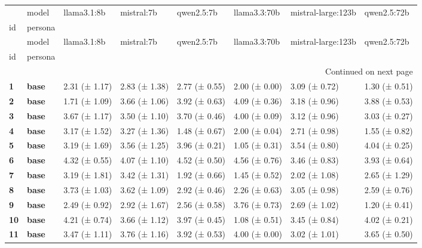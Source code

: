 \begin{longtable}{llllllll}
\toprule
 & model & llama3.1:8b & mistral:7b & qwen2.5:7b & llama3.3:70b & mistral-large:123b & qwen2.5:72b \\
id & persona &  &  &  &  &  &  \\
\midrule
\endfirsthead
\toprule
 & model & llama3.1:8b & mistral:7b & qwen2.5:7b & llama3.3:70b & mistral-large:123b & qwen2.5:72b \\
id & persona &  &  &  &  &  &  \\
\midrule
\endhead
\midrule
\multicolumn{8}{r}{Continued on next page} \\
\midrule
\endfoot
\bottomrule
\endlastfoot
\textbf{1} & \textbf{base} & 2.31 (± 1.17) & 2.83 (± 1.38) & 2.77 (± 0.55) & 2.00 (± 0.00) & 3.09 (± 0.72) & 1.30 (± 0.51) \\
\cline{1-8}
\textbf{2} & \textbf{base} & 1.71 (± 1.09) & 3.66 (± 1.06) & 3.92 (± 0.63) & 4.09 (± 0.36) & 3.18 (± 0.96) & 3.88 (± 0.53) \\
\cline{1-8}
\textbf{3} & \textbf{base} & 3.67 (± 1.17) & 3.50 (± 1.10) & 3.70 (± 0.46) & 4.00 (± 0.09) & 3.12 (± 0.96) & 3.03 (± 0.27) \\
\cline{1-8}
\textbf{4} & \textbf{base} & 3.17 (± 1.52) & 3.27 (± 1.36) & 1.48 (± 0.67) & 2.00 (± 0.04) & 2.71 (± 0.98) & 1.55 (± 0.82) \\
\cline{1-8}
\textbf{5} & \textbf{base} & 3.19 (± 1.69) & 3.56 (± 1.25) & 3.96 (± 0.21) & 1.05 (± 0.31) & 3.54 (± 0.80) & 4.04 (± 0.25) \\
\cline{1-8}
\textbf{6} & \textbf{base} & 4.32 (± 0.55) & 4.07 (± 1.10) & 4.52 (± 0.50) & 4.56 (± 0.76) & 3.46 (± 0.83) & 3.93 (± 0.64) \\
\cline{1-8}
\textbf{7} & \textbf{base} & 3.19 (± 1.81) & 3.42 (± 1.31) & 1.92 (± 0.66) & 1.45 (± 0.52) & 2.02 (± 1.08) & 2.65 (± 1.29) \\
\cline{1-8}
\textbf{8} & \textbf{base} & 3.73 (± 1.03) & 3.62 (± 1.09) & 2.92 (± 0.46) & 2.26 (± 0.63) & 3.05 (± 0.98) & 2.59 (± 0.76) \\
\cline{1-8}
\textbf{9} & \textbf{base} & 2.49 (± 0.92) & 2.92 (± 1.67) & 2.56 (± 0.58) & 3.76 (± 0.73) & 2.69 (± 1.02) & 1.20 (± 0.41) \\
\cline{1-8}
\textbf{10} & \textbf{base} & 4.21 (± 0.74) & 3.66 (± 1.12) & 3.97 (± 0.45) & 1.08 (± 0.51) & 3.45 (± 0.84) & 4.02 (± 0.21) \\
\cline{1-8}
\textbf{11} & \textbf{base} & 3.47 (± 1.11) & 3.76 (± 1.16) & 3.92 (± 0.53) & 4.00 (± 0.00) & 3.02 (± 1.01) & 3.65 (± 0.50) \\

\end{longtable}
